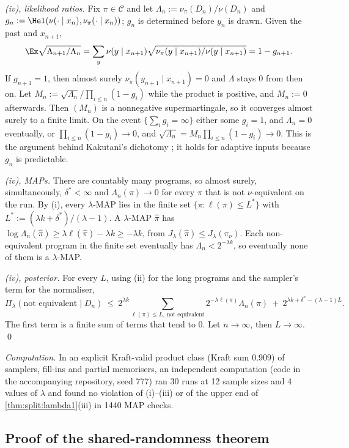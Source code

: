 \emph{(iv), likelihood ratios.} Fix $\pi\in\mathcal C$ and let $\Lambda_n:=\nu_\pi(D_n)/\nu(D_n)$ and $g_n:=\Hel(\nu(\cdot\mid x_n),\nu_\pi(\cdot\mid x_n))$; $g_n$ is determined before $y_n$ is drawn. Given the past and $x_{n+1}$,
\[
\Ex\sqrt{\Lambda_{n+1}/\Lambda_n}=\sum_y\nu(y\mid x_{n+1})\sqrt{\nu_\pi(y\mid x_{n+1})/\nu(y\mid x_{n+1})}=1-g_{n+1}.
\]
If $g_{n+1}=1$, then almost surely $\nu_\pi(y_{n+1}\mid x_{n+1})=0$ and $\Lambda$ stays $0$ from then on. Let $M_n:=\sqrt{\Lambda_n}/\prod_{i\le n}(1-g_i)$ while the product is positive, and $M_n:=0$ afterwards. Then $(M_n)$ is a nonnegative supermartingale, so it converges almost surely to a finite limit. On the event $\{\sum_ig_i=\infty\}$ either some $g_i=1$, and $\Lambda_n=0$ eventually, or $\prod_{i\le n}(1-g_i)\to0$, and $\sqrt{\Lambda_n}=M_n\prod_{i\le n}(1-g_i)\to0$. This is the argument behind Kakutani's dichotomy \citep{kakutani1948equivalence}; it holds for adaptive inputs because $g_n$ is predictable.

\emph{(iv), MAPs.} There are countably many programs, so almost surely, simultaneously, $\delta^*<\infty$ and $\Lambda_n(\pi)\to0$ for every $\pi$ that is not $\nu$-equivalent on the run. By (i), every $\lambda$-MAP lies in the finite set $\{\pi:\ell(\pi)\le L^*\}$ with $L^*:=(\lambda k+\delta^*)/(\lambda-1)$. A $\lambda$-MAP $\hat\pi$ has $\log\Lambda_n(\hat\pi)\ge\lambda\ell(\hat\pi)-\lambda k\ge-\lambda k$, from $J_\lambda(\hat\pi)\le J_\lambda(\pi_\nu)$. Each non-equivalent program in the finite set eventually has $\Lambda_n<2^{-\lambda k}$, so eventually none of them is a $\lambda$-MAP.

\emph{(iv), posterior.} For every $L$, using (ii) for the long programs and the sampler's term for the normaliser,
\[
\Pi_\lambda(\text{not equivalent}\mid D_n)\ \le\ 2^{\lambda k}\sum_{\ell(\pi)\le L,\ \text{not equivalent}}2^{-\lambda\ell(\pi)}\Lambda_n(\pi)\ +\ 2^{\lambda k+\delta^*-(\lambda-1)L}.
\]
The first term is a finite sum of terms that tend to $0$. Let $n\to\infty$, then $L\to\infty$. \qed

\emph{Computation.} In an explicit Kraft-valid product class (Kraft sum $0.909$) of samplers, fill-ins and partial memorisers, an independent computation (code in the accompanying repository, seed 777) ran 30 runs at 12 sample sizes and 4 values of $\lambda$ and found no violation of (i)--(iii) or of the upper end of \cref{thm:split:lambda1}(iii) in 1440 MAP checks.

\subsection{Proof of the shared-randomness theorem}\label{app:split:shared}

